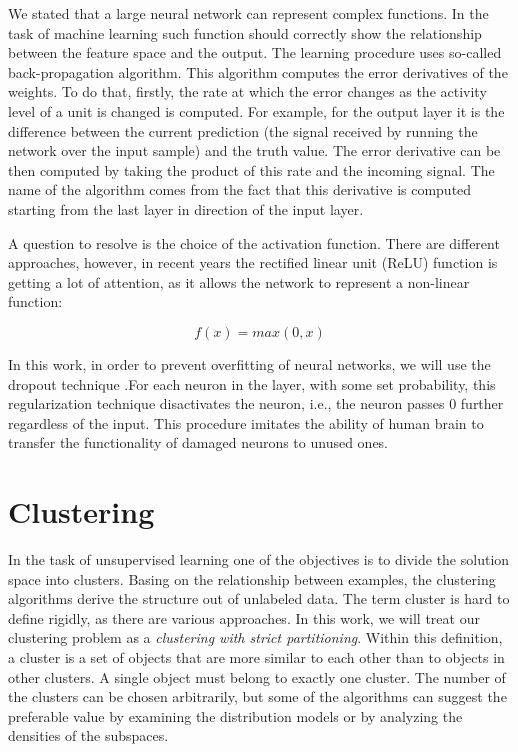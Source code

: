 \documentclass{pracamgr}
\begin{document}
We stated that a large neural network can represent complex functions. In
the task of machine learning such function should correctly show the relationship
between the feature space and the output. The learning
procedure uses so-called back-propagation algorithm. This algorithm computes
the error derivatives of the weights. To do that, firstly, the rate at which the error
changes as the activity level of a unit is changed is computed. For example, for the
output layer it is the difference between the current prediction (the signal
received by running the network over the input sample) and the truth value. The
error derivative can be then computed by taking the product of this rate and the
incoming signal. The name of the algorithm comes from the fact that this derivative
is computed starting from the last layer in direction of the input layer.

A question to resolve is the choice of the activation function. There are different
approaches, however, in recent years the rectified linear unit (ReLU) function is
getting a lot of attention, as it allows the network to represent a non-linear function:

\begin{equation}
f(x) = max(0,x)
\end{equation}

In this work, in order to prevent overfitting of neural networks, we will use the dropout
technique \citep{dropout}.For each neuron in the layer, with some set probability,
this regularization technique disactivates the neuron, i.e., the neuron passes 0
further regardless of the input. This procedure imitates the ability of human brain to
transfer the functionality of damaged neurons to unused ones.

\section{Clustering}
In the task of unsupervised learning one of the objectives is to divide the solution 
space  into clusters. Basing on the relationship between examples, the clustering
algorithms derive the structure out of unlabeled data. The term cluster is hard
to define rigidly, as there are various approaches. In this work, we will treat
our clustering problem as a \textit{clustering with strict partitioning}.
Within this definition, a cluster is a set of objects that are more similar to each
other than to objects in other clusters. A single object must belong to exactly
one cluster. The number of the clusters can be
chosen arbitrarily, but some of the algorithms can suggest the preferable value by
examining the distribution models or by analyzing the densities of the subspaces.
\end{document}
